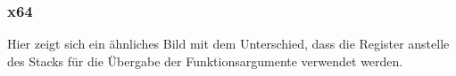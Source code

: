 \subsubsection{x64}

Hier zeigt sich ein ähnliches Bild mit dem Unterschied, dass die Register anstelle des Stacks für die Übergabe der Funktionsargumente verwendet werden.







